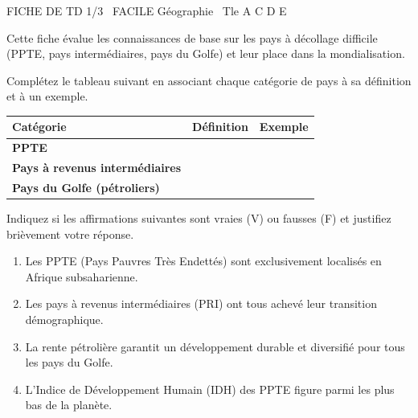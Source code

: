 \documentclass[11pt]{article}
\begin{document}
\begin{tcolorbox}[enhanced,colback=popink,colframe=popink,arc=10pt,boxrule=0pt,left=12pt,right=12pt,top=9pt,bottom=9pt]
{\color{white}\popxbold\small FICHE DE TD 1/3 \textbullet\ FACILE \hfill Géographie \textbullet\ Tle A C D E\par}
\end{tcolorbox}
\vspace{4pt}
Cette fiche évalue les connaissances de base sur les pays à décollage difficile (PPTE, pays intermédiaires, pays du Golfe) et leur place dans la mondialisation.

\begin{exercice}
Complétez le tableau suivant en associant chaque catégorie de pays à sa définition et à un exemple.
\begin{tabularx}{\linewidth}{>{\bfseries}l X X}
\toprule
Catégorie & Définition & Exemple \\
\midrule
PPTE & \dotfill & \dotfill \\
Pays à revenus intermédiaires & \dotfill & \dotfill \\
Pays du Golfe (pétroliers) & \dotfill & \dotfill \\
\bottomrule
\end{tabularx}
\end{exercice}

\begin{exercice}
Indiquez si les affirmations suivantes sont vraies (V) ou fausses (F) et justifiez brièvement votre réponse.
\begin{enumerate}
\item Les PPTE (Pays Pauvres Très Endettés) sont exclusivement localisés en Afrique subsaharienne.
\item Les pays à revenus intermédiaires (PRI) ont tous achevé leur transition démographique.
\item La rente pétrolière garantit un développement durable et diversifié pour tous les pays du Golfe.
\item L'Indice de Développement Humain (IDH) des PPTE figure parmi les plus bas de la planète.
\end{enumerate}
\end{exercice}
\end{document}
